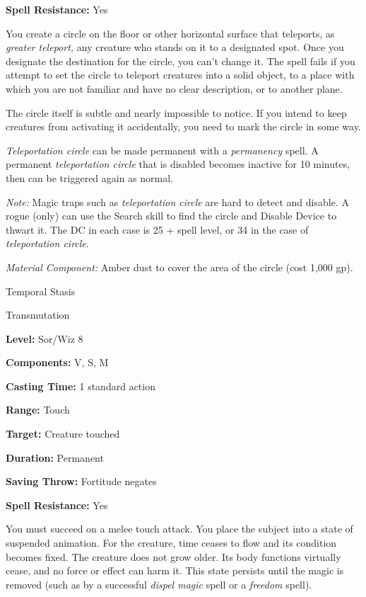 \documentclass{article}
\begin{document}
\textbf{Spell Resistance:} Yes

You create a circle on the floor or other horizontal surface that teleports, as 
\textit{greater teleport, }any creature who stands on it to a designated spot. 
Once you designate the destination for the circle, you can't change it. The spell 
fails if you attempt to set the circle to teleport creatures into a solid object, 
to a place with which you are not familiar and have no clear description, or to 
another plane.

The circle itself is subtle and nearly impossible to notice. If you intend to keep 
creatures from activating it accidentally, you need to mark the circle in some 
way.

\textit{Teleportation circle }can be made permanent with a \textit{permanency }spell. 
A permanent \textit{teleportation circle }that is disabled becomes inactive for 
10 minutes, then can be triggered again as normal.

\textit{Note: }Magic traps such as \textit{teleportation circle }are hard to detect 
and disable. A rogue (only) can use the Search skill to find the circle and Disable 
Device to thwart it. The DC in each case is 25 + spell level, or 34 in the case 
of \textit{teleportation circle}.

\textit{Material Component: }Amber dust to cover the area of the circle (cost 1,000 
gp).

\vspace{12pt}
Temporal Stasis

Transmutation

\textbf{Level:} Sor/Wiz 8

\textbf{Components:} V, S, M

\textbf{Casting Time:} 1 standard action

\textbf{Range:} Touch

\textbf{Target:} Creature touched

\textbf{Duration:} Permanent

\textbf{Saving Throw:} Fortitude negates

\textbf{Spell Resistance:} Yes

You must succeed on a melee touch attack. You place the subject into a state of 
suspended animation. For the creature, time ceases to flow and its condition becomes 
fixed. The creature does not grow older. Its body functions virtually cease, and 
no force or effect can harm it. This state persists until the magic is removed 
(such as by a successful \textit{dispel magic }spell or a \textit{freedom }spell).
\end{document}

